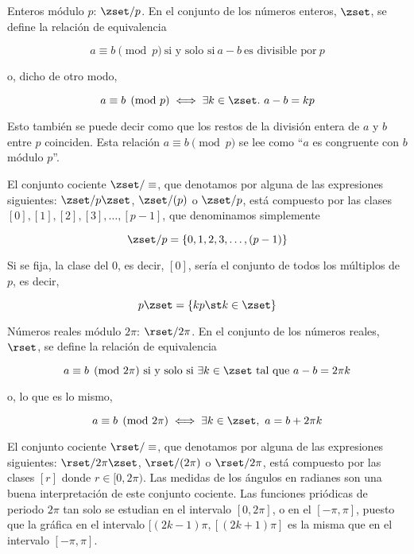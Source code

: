 \begin{example}
  Enteros módulo $p$: $\zset/p$. En el conjunto de los números enteros,
  $\zset$, se define la relación de equivalencia

  \[ a \equiv b \pmod p \ \text{si y solo si} \ a - b \ \text{es divisible
  por} \ p \]

  \noindent o, dicho de otro modo,

  \[ a \equiv b \pmod p \iff \exists k \in \zset. \ a - b = kp \]

  \noindent Esto también se puede decir como que los restos de la división
  entera de $a$ y $b$ entre $p$ coinciden. Esta relación $a \equiv b \pmod
  p$ se lee como ``$a$ es congruente con $b$ módulo $p$''.

  El conjunto cociente $\zset/\equiv$, que denotamos por alguna de las
  expresiones siguientes: $\zset/p\zset$, $\zset/(p)$ o $\zset/p$, está
  compuesto por las clases $[0], [1], [2], [3], \ldots, [p-1]$, que
  denominamos simplemente

  \[ \zset/p = \{0, 1, 2, 3, \ldots , (p-1)\} \]

  Si se fija, la clase del $0$, es decir, $[0]$, sería el conjunto de todos
  los múltiplos de $p$, es decir,

  \[ p\zset = \{kp \st k \in \zset\} \]
\end{example}

\begin{example}
  Números reales módulo $2\pi$: $\rset/2\pi$. En el conjunto de los números
  reales, $\rset$, se define la relación de equivalencia

  \[ a \equiv b \pmod {2\pi} \ \text{si y solo si} \ \exists k \in \zset \
  \text{tal que} \ a - b = 2\pi k \]

  \noindent o, lo que es lo mismo,

  \[ a \equiv b \pmod {2\pi} \iff \exists k \in \zset, \ a = b + 2\pi k \]

  El conjunto cociente $\rset/\equiv$, que denotamos por alguna de las
  expresiones siguientes: $\rset/2\pi\zset$, $\rset/(2\pi)$ o $\rset/2\pi$,
  está compuesto por las clases $[r]$ donde $r \in [0, 2\pi)$. Las medidas
  de los ángulos en radianes son una buena interpretación de este conjunto
  cociente. Las funciones priódicas de periodo $2\pi$ tan solo se estudian
  en el intervalo $[0, 2\pi]$, o en el $[{-\pi}, \pi]$, puesto que la
  gráfica en el intervalo $[(2k - 1)\pi, [(2k + 1)\pi]$ es la misma que en
  el intervalo $[{-\pi}, \pi]$.
\end{example}

